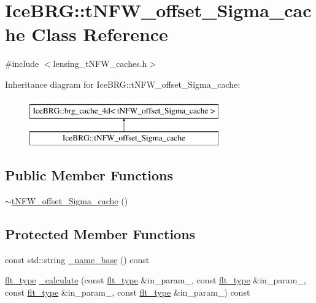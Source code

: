 \hypertarget{classIceBRG_1_1tNFW__offset__Sigma__cache}{\section{Ice\-B\-R\-G\-:\-:t\-N\-F\-W\-\_\-offset\-\_\-\-Sigma\-\_\-cache Class Reference}
\label{classIceBRG_1_1tNFW__offset__Sigma__cache}
}


{\ttfamily \#include $<$lensing\-\_\-t\-N\-F\-W\-\_\-caches.\-h$>$}

Inheritance diagram for Ice\-B\-R\-G\-:\-:t\-N\-F\-W\-\_\-offset\-\_\-\-Sigma\-\_\-cache\-:\begin{figure}[H]
\begin{center}
\leavevmode
\includegraphics[height=2.000000cm]{classIceBRG_1_1tNFW__offset__Sigma__cache}
\end{center}
\end{figure}
\subsection*{Public Member Functions}
\begin{DoxyCompactItemize}
\item 
\hyperlink{classIceBRG_1_1tNFW__offset__Sigma__cache_a13dd2428c8cf0b54f1b97aea7e5edb63}{$\sim$t\-N\-F\-W\-\_\-offset\-\_\-\-Sigma\-\_\-cache} ()
\end{DoxyCompactItemize}
\subsection*{Protected Member Functions}
\begin{DoxyCompactItemize}
\item 
const std\-::string \hyperlink{classIceBRG_1_1tNFW__offset__Sigma__cache_a8880eaf40b9befee40ad062029d90766}{\-\_\-name\-\_\-base} () const 
\item 
\hyperlink{lib_2IceBRG__main_2common_8h_ad0f130a56eeb944d9ef2692ee881ecc4}{flt\-\_\-type} \hyperlink{classIceBRG_1_1tNFW__offset__Sigma__cache_ad21361cf013e2da85ac26a85af773b94}{\-\_\-calculate} (const \hyperlink{lib_2IceBRG__main_2common_8h_ad0f130a56eeb944d9ef2692ee881ecc4}{flt\-\_\-type} \&in\-\_\-param\-\_, const \hyperlink{lib_2IceBRG__main_2common_8h_ad0f130a56eeb944d9ef2692ee881ecc4}{flt\-\_\-type} \&in\-\_\-param\-\_, const \hyperlink{lib_2IceBRG__main_2common_8h_ad0f130a56eeb944d9ef2692ee881ecc4}{flt\-\_\-type} \&in\-\_\-param\-\_, const \hyperlink{lib_2IceBRG__main_2common_8h_ad0f130a56eeb944d9ef2692ee881ecc4}{flt\-\_\-type} \&in\-\_\-param\-\_) const 
\end{DoxyCompactItemize}
